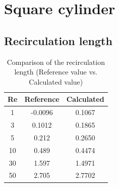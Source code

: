 \chapter{Square cylinder}
\section{Recirculation length}
\begin{table}[H]
	\centering
	\begin{tabular}{ |c|c|c| }
		\hline
		Re & Reference & Calculated \\ \hline
		1 & -0.0096 & 0.1067 \\ \hline
		3 & 0.1012 & 0.1865 \\ \hline
		5 & 0.212 & 0.2650 \\ \hline
		10 & 0.489 & 0.4474 \\ \hline
		30 & 1.597 & 1.4971 \\ \hline
		50 & 2.705 & 2.7702 \\ \hline
	\end{tabular}
\caption[Comparison of the recirculation length (Reference value vs. Calculated value)]{Comparison of the recirculation length (Reference value vs. Calculated value) \cite{Breuer2000}}
\end{table}


